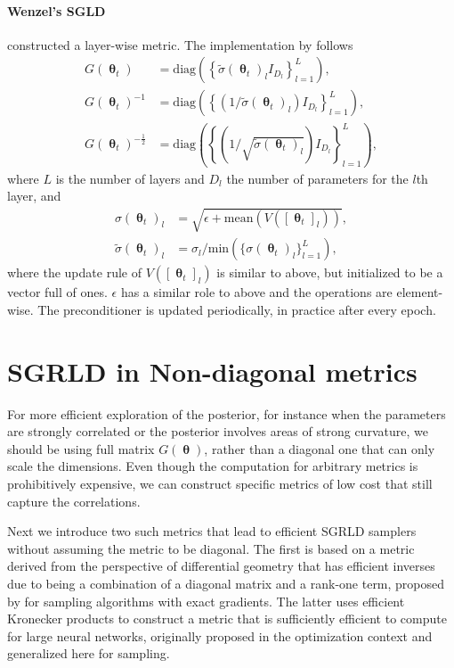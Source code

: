 \documentclass[10pt]{article} %
\DeclareMathOperator{\btheta}{\boldsymbol{\theta}}
\theoremstyle{plain}
\theoremstyle{definition}
\theoremstyle{remark}
\begin{document}
\paragraph{Wenzel's SGLD}
\citet{Wenzel2020} constructed a layer-wise metric. The implementation by \citet{Fortuin2021} follows
\begin{align*}
G(\btheta_t) &= \text{diag}\left(\left\{ \tilde{\sigma}(\btheta_t)_{l}I_{D_l} \right\}_{l=1}^{L} \right),\\
G(\btheta_t)^{-1} &= \text{diag}\left(\left\{ \left(1 / \tilde{\sigma}(\btheta_t)_{l}\right)I_{D_l} \right\}_{l=1}^{L} \right),\\
G(\btheta_t)^{-\frac{1}{2}} &= \text{diag}\left( \left\{\left(1 / \sqrt{\tilde{\sigma}(\btheta_t)_{l}}\right)I_{D_l} \right\}_{l=1}^{L} \right),
\end{align*}
where $L$ is the number of layers and $D_{l}$ the number of parameters for the $l$th layer, and
\begin{align*}
\sigma(\btheta_t)_{l} &= \sqrt{\epsilon + \text{mean}(V([\btheta_t]_{l}))},\\
\tilde{\sigma}(\btheta_t)_{l} &= \sigma_{l} / \text{min}(\{\sigma(\btheta_t)_l\}_{l=1}^{L}),
\end{align*}
where the update rule of $V([\btheta_t]_l)$ is similar to above, but initialized to be a vector full of ones. $\epsilon$ has a similar role to above and the operations are element-wise. The preconditioner is updated periodically, in practice after every epoch.

\section{SGRLD in Non-diagonal metrics}

For more efficient exploration of the posterior, for instance when the parameters are strongly correlated or the posterior involves areas of strong curvature, we should be using full matrix $G(\btheta)$, rather than a diagonal one that can only scale the dimensions. Even though the computation for arbitrary metrics is prohibitively expensive, we can construct specific metrics of low cost that still capture the correlations.

Next we introduce two such metrics that lead to efficient SGRLD samplers without assuming the metric to be diagonal. The first is based on a metric derived from the perspective of differential geometry that has efficient inverses due to being a combination of a diagonal matrix and a rank-one term, proposed by \citep{Hartmann2022} for sampling algorithms with exact gradients. The latter uses efficient Kronecker products to construct a metric that is sufficiently efficient to compute for large neural networks, originally proposed in the optimization context \citep{Gupta2018,Anil2021} and generalized here for sampling.
\end{document}
